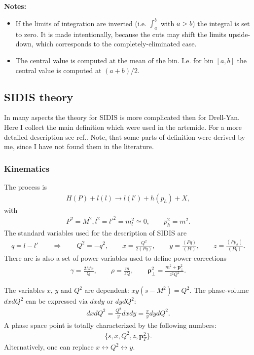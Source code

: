 \documentclass[prd,nofootinbib,eqsecnum,final]{revtex4}
\renewcommand{\(}{\left(}
\renewcommand{\)}{\right)}
\renewcommand{\[}{\left[}
\renewcommand{\]}{\right]}
\renewcommand{\vec}[1]{\bm{#1}}
\begin{document}
\textbf{Notes:} 
\begin{itemize}
\item If the limits of integration are inverted (i.e. $\int_a^b$ with $a>b$) the integral is set to zero. It is made intentionally, because the cuts may shift the limits upside-down, which corresponds to the completely-eliminated case.
\item The central value is computed at the mean of the bin. I.e. for bin $[a,b]$ the central value is computed at $(a+b)/2$.
\end{itemize}




\subsection{SIDIS theory}
\label{sec:SIDIS:theory}

In many aspects the theory for SIDIS is more complicated then for Drell-Yan. Here I collect the main definition which were used in the artemide. For a more detailed description see ref.\cite{Bacchetta:2006tn}. Note, that some parts of definition were derived by me, since I have not found them in the literature.

\subsubsection{Kinematics}

The process is
\begin{eqnarray}
H(P)+l(l)\to l(l')+h(p_h)+X,
\end{eqnarray}
with
\begin{eqnarray}
P^2=M^2, l^2=l'^2=m_l^2\simeq 0,\qquad p_h^2=m^2.
\end{eqnarray}
The standard variables used for the description of SIDIS are
\begin{eqnarray}
q=l-l' \qquad \Rightarrow \qquad Q^2=-q^2,\qquad x=\frac{Q^2}{2(Pq)},\qquad y=\frac{(Pq)}{(Pl)},\qquad z=\frac{(Pp_h)}{(Pq)}.
\end{eqnarray}
There are is also a set of power variables used to define power-corrections
\begin{eqnarray}
\gamma=\frac{2Mx}{Q},\qquad \rho=\frac{m}{zQ},\qquad \vec \rho_\perp^2=\frac{m^2+\vec p_\perp^2}{z^2Q^2}.
\end{eqnarray}

The variables $x$, $y$ and $Q^2$ are dependent: $xy(s-M^2)=Q^2$. The phase-volume $dxdQ^2$ can be expressed via $dxdy$ or $dydQ^2$:
\begin{eqnarray}
dxdQ^2= \frac{Q^2}{y}dxdy=\frac{x}{y}dydQ^2.
\end{eqnarray}
A phase space point is totally characterized by the following numbers:
\begin{eqnarray}
\{s,x,Q^2,z,\vec p_T^2\}.
\end{eqnarray}
Alternatively, one can replace $x\leftrightarrow Q^2 \leftrightarrow y$.
\end{document}
